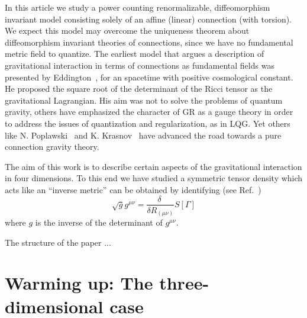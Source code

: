 \documentclass[twocolumn,aps,
  showpacs,showkeys,prd,superscriptaddress]{revtex4-1}
\begin{document}
In this article we study a power counting renormalizable,  diffeomorphism invariant model  consisting  solely of an affine (linear) connection  (with torsion).
We expect  this model may  overcome  the uniqueness theorem about diffeomorphism invariant theories of connections, since we  have no fundamental metric field to quantize. The earliest model that argues  a description of gravitational interaction in terms of connections as fundamental fields  was presented by Eddington~\cite{Eddington1923math}, for an spacetime with positive cosmological constant. He proposed the square root of the determinant of the Ricci tensor as the gravitational Lagrangian. His aim was not to solve the problems of quantum gravity,  others have emphasized the character of GR as a gauge theory in order to address the issues of quantization and regularization, as in LQG. Yet others like N. Poplawski~\cite{Poplawski:2012bw} and K. Krasnov~\cite{Krasnov:2011pp} have advanced the road towards a pure connection gravity theory.

The aim of this work is to describe certain aspects of the gravitational interaction in four dimensions. To this end we have studied a  symmetric tensor density which acts like an ``inverse metric'' can be obtained by identifying (see Ref.~\cite{Poplawski:2012bw})
\begin{equation}\label{metric}
  \sqrt{g}g^{\mu\nu} = \frac{\delta\ }{\delta R_{(\mu\nu)}} S[\Gamma]
\end{equation}
where $g$ is the inverse of the determinant of $g^{\mu\nu}$.

The structure of the paper ...




\section{Warming up: The three-dimensional case}
\end{document}
